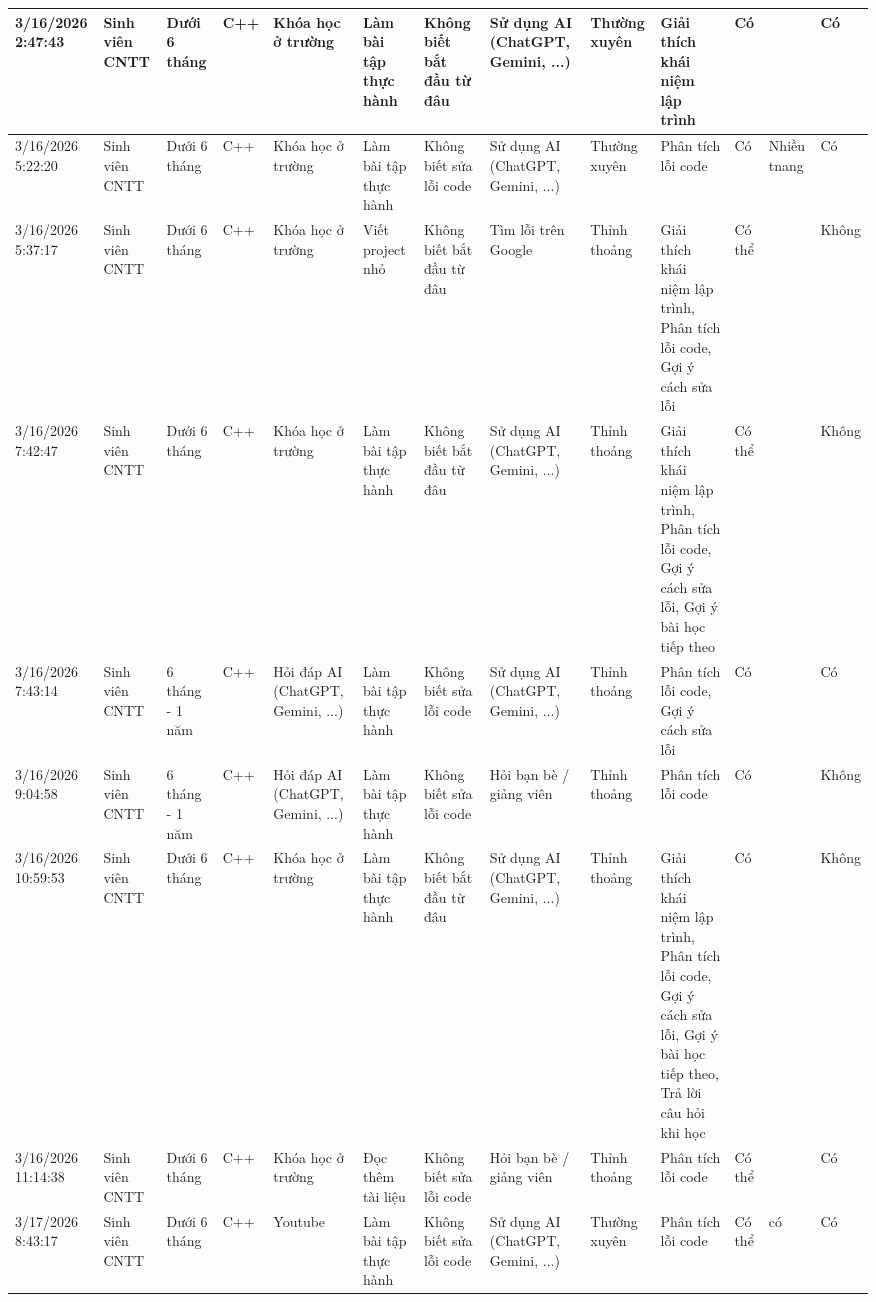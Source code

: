 \documentclass[../main.tex]{subfiles}
\begin{document}
\begin{landscape}
{\begin{tabularx}{\textwidth}{|p{1cm}|p{1.50cm}|p{1.35cm}|p{1.3cm}|p{1.50cm}|p{1.55cm}|p{1.55cm}|p{1.55cm}|p{1.55cm}|p{2.50cm}|p{1.55cm}|p{1.55cm}|p{1.55cm}|}
\hline
3/16/2026 2:47:43 & Sinh viên CNTT & Dưới 6 tháng & C++ & Khóa học ở trường & Làm bài tập thực hành & Không biết bắt đầu từ đâu & Sử dụng AI (ChatGPT, Gemini, ...) & Thường xuyên & Giải thích khái niệm lập trình & Có &  & Có \\
\hline
3/16/2026 5:22:20 & Sinh viên CNTT & Dưới 6 tháng & C++ & Khóa học ở trường & Làm bài tập thực hành & Không biết sửa lỗi code & Sử dụng AI (ChatGPT, Gemini, ...) & Thường xuyên & Phân tích lỗi code & Có & Nhiều tnang & Có \\
\hline
3/16/2026 5:37:17 & Sinh viên CNTT & Dưới 6 tháng & C++ & Khóa học ở trường & Viết project nhỏ & Không biết bắt đầu từ đâu & Tìm lỗi trên Google & Thỉnh thoảng & Giải thích khái niệm lập trình, Phân tích lỗi code, Gợi ý cách sửa lỗi & Có thể &  & Không \\
\hline
3/16/2026 7:42:47 & Sinh viên CNTT & Dưới 6 tháng & C++ & Khóa học ở trường & Làm bài tập thực hành & Không biết bắt đầu từ đâu & Sử dụng AI (ChatGPT, Gemini, ...) & Thỉnh thoảng & Giải thích khái niệm lập trình, Phân tích lỗi code, Gợi ý cách sửa lỗi, Gợi ý bài học tiếp theo & Có thể &  & Không \\
\hline
3/16/2026 7:43:14 & Sinh viên CNTT & 6 tháng - 1 năm & C++ & Hỏi đáp AI (ChatGPT, Gemini, ...) & Làm bài tập thực hành & Không biết sửa lỗi code & Sử dụng AI (ChatGPT, Gemini, ...) & Thỉnh thoảng & Phân tích lỗi code, Gợi ý cách sửa lỗi & Có &  & Có \\
\hline
3/16/2026 9:04:58 & Sinh viên CNTT & 6 tháng - 1 năm & C++ & Hỏi đáp AI (ChatGPT, Gemini, ...) & Làm bài tập thực hành & Không biết sửa lỗi code & Hỏi bạn bè / giảng viên & Thỉnh thoảng & Phân tích lỗi code & Có &  & Không \\
\hline
3/16/2026 10:59:53 & Sinh viên CNTT & Dưới 6 tháng & C++ & Khóa học ở trường & Làm bài tập thực hành & Không biết bắt đầu từ đâu & Sử dụng AI (ChatGPT, Gemini, ...) & Thỉnh thoảng & Giải thích khái niệm lập trình, Phân tích lỗi code, Gợi ý cách sửa lỗi, Gợi ý bài học tiếp theo, Trả lời câu hỏi khi học & Có &  & Không \\
\hline
3/16/2026 11:14:38 & Sinh viên CNTT & Dưới 6 tháng & C++ & Khóa học ở trường & Đọc thêm tài liệu & Không biết sửa lỗi code & Hỏi bạn bè / giảng viên & Thỉnh thoảng & Phân tích lỗi code & Có thể &  & Có \\
\hline
3/17/2026 8:43:17 & Sinh viên CNTT & Dưới 6 tháng & C++ & Youtube & Làm bài tập thực hành & Không biết sửa lỗi code & Sử dụng AI (ChatGPT, Gemini, ...) & Thường xuyên & Phân tích lỗi code & Có thể & có & Có \\

\end{tabularx}}
\end{landscape}
\end{document}
